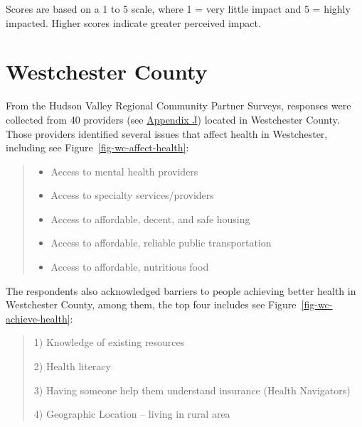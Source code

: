 \documentclass[
  english,
  letterpaper,
]{report}
\begin{document}
\begin{tcolorbox}[enhanced jigsaw, breakable, leftrule=.75mm, title=\textcolor{quarto-callout-note-color}{\faInfo}\hspace{0.5em}{Note}, bottomrule=.15mm, opacityback=0, left=2mm, colback=white, bottomtitle=1mm, coltitle=black, colbacktitle=quarto-callout-note-color!10!white, colframe=quarto-callout-note-color-frame, opacitybacktitle=0.6, toptitle=1mm, titlerule=0mm, arc=.35mm, rightrule=.15mm, toprule=.15mm]

Scores are based on a 1 to 5 scale, where 1 = very little impact and 5 =
highly impacted. Higher scores indicate greater perceived impact.

\end{tcolorbox}

\section{Westchester County}\label{westchester-county-2}

From the Hudson Valley Regional Community Partner Surveys, responses
were collected from 40 providers (see
\hyperref[sec-appendix-j-community-partner-survey-references]{Appendix
J}) located in Westchester County. Those providers identified several
issues that affect health in Westchester, including see
Figure~\ref{fig-wc-affect-health}:

\begin{quote}
\begin{itemize}
\item
  Access to mental health providers
\item
  Access to specialty services/providers
\item
  Access to affordable, decent, and safe housing
\item
  Access to affordable, reliable public transportation
\item
  Access to affordable, nutritious food
\end{itemize}
\end{quote}

The respondents also acknowledged barriers to people achieving better
health in Westchester County, among them, the top four includes see
Figure~\ref{fig-wc-achieve-health}:

\begin{quote}
1) Knowledge of existing resources

2) Health literacy

3) Having someone help them understand insurance (Health Navigators)

4) Geographic Location -- living in rural area
\end{quote}
\end{document}
